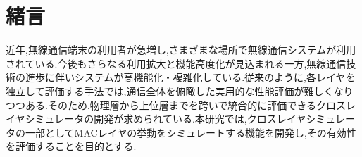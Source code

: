 \documentclass[a4paper, 10pt]{ltjsarticle}
\begin{document}
\setlength{\columnsep}{7.5mm}

\twocolumn[
    \begin{center}
        {\vspace{-1em}}

        {\fontsize{15pt}{15pt}\selectfont{クロスレイヤシミュレータにおける無線LAN評価モデルの検討}}

        {\vspace{1.3em}}

        {\fontsize{13pt}{13pt}\selectfont{A Study of a Wireless LAN Evaluation Model in a Cross-Layer Simulator}}
    \end{center}

    \vspace{0.1em}

    \begin{flushright}
      {\fontsize{11pt}{11pt}\selectfont{T5-16 \, 下沢亮太郎}}
      \\
      {\fontsize{11pt}{11pt}\selectfont{指導教員 \, 設樂勇}}
    \end{flushright}

    \vspace{1em}

    \thispagestyle{empty}
]

\section{緒言}

近年,無線通信端末の利用者が急増し,さまざまな場所で無線通信システムが利用されている.今後もさらなる利用拡大と機能高度化が見込まれる一方,無線通信技術の進歩に伴いシステムが高機能化・複雑化している.従来のように,各レイヤを独立して評価する手法では,通信全体を俯瞰した実用的な性能評価が難しくなりつつある.そのため,物理層から上位層までを跨いで統合的に評価できるクロスレイヤシミュレータの開発が求められている.本研究では,クロスレイヤシミュレータの一部としてMACレイヤの挙動をシミュレートする機能を開発し,その有効性を評価することを目的とする.
\end{document}
